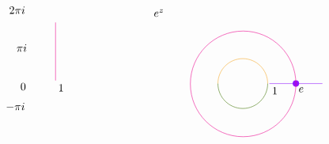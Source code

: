 \documentclass[12pt]{article}
\begin{document}
\[\begin{tikzpicture}[x=0.75pt,y=0.75pt,yscale=-1,xscale=1]
    \draw [color={rgb, 255:red, 144; green, 19; blue, 254 }  ,draw opacity=1 ]   (435.35,134.06) -- (467.35,134.06) ;
    \draw [shift={(435.35,134.06)}, rotate = 0] [color={rgb, 255:red, 144; green, 19; blue, 254 }  ,draw opacity=1 ][fill={rgb, 255:red, 144; green, 19; blue, 254 }  ,fill opacity=1 ][line width=0.75]      (0, 0) circle [x radius= 3.35, y radius= 3.35]   ;
    \draw [color={rgb, 255:red, 144; green, 19; blue, 254 }  ,draw opacity=1 ]   (403.35,134.06) -- (435.35,134.06) ;
    \draw  [draw opacity=0] (341.35,134.06) .. controls (341.35,134.06) and (341.35,134.06) .. (341.35,134.06) .. controls (341.35,117.49) and (354.78,104.06) .. (371.35,104.06) .. controls (387.92,104.06) and (401.35,117.49) .. (401.35,134.06) .. controls (401.35,134.06) and (401.35,134.06) .. (401.35,134.06) -- (371.35,134.06) -- cycle ; \draw [color={rgb, 255:red, 245; green, 166; blue, 35 }  ,draw opacity=1 ]   (341.35,134.06) .. controls (341.35,117.49) and (354.78,104.06) .. (371.35,104.06) .. controls (387.92,104.06) and (401.35,117.49) .. (401.35,134.06) ;  
    \draw  [draw opacity=0] (401.35,134.06) .. controls (401.35,134.06) and (401.35,134.06) .. (401.35,134.06) .. controls (401.35,150.63) and (387.92,164.06) .. (371.35,164.06) .. controls (354.78,164.06) and (341.35,150.63) .. (341.35,134.06) .. controls (341.35,134.06) and (341.35,134.06) .. (341.35,134.06) -- (371.35,134.06) -- cycle ; \draw [color={rgb, 255:red, 65; green, 117; blue, 5 }  ,draw opacity=1 ]   (401.35,134.06) .. controls (401.35,150.63) and (387.92,164.06) .. (371.35,164.06) .. controls (354.78,164.06) and (341.35,150.63) .. (341.35,134.06) ;  
    \draw [color=magenta  ,draw opacity=1 ]   (145.63,60.46) -- (145.63,130.39) ;
    \draw  [color=magenta  ,draw opacity=1 ] (308.15,134.46) .. controls (308.15,99.34) and (336.63,70.86) .. (371.75,70.86) .. controls (406.88,70.86) and (435.35,99.34) .. (435.35,134.46) .. controls (435.35,169.59) and (406.88,198.06) .. (371.75,198.06) .. controls (336.63,198.06) and (308.15,169.59) .. (308.15,134.46) -- cycle ;
    
    \draw (102,132.4) node [anchor=north west][inner sep=0.75pt]    {$0$};
    \draw (147.63,133.79) node [anchor=north west][inner sep=0.75pt]    {$1$};
    \draw (88.4,40) node [anchor=north west][inner sep=0.75pt]    {$2\pi i$};
    \draw (97.2,85.6) node [anchor=north west][inner sep=0.75pt]    {$\pi i$};
    \draw (84.4,156) node [anchor=north west][inner sep=0.75pt]    {$-\pi i$};
    \draw (262.8,43.4) node [anchor=north west][inner sep=0.75pt]    {$e^{z}$};
    \draw (405.35,137.46) node [anchor=north west][inner sep=0.75pt]    {$1$};
    \draw (437.35,137.46) node [anchor=north west][inner sep=0.75pt]    {$e$};
    
    
    \end{tikzpicture}
    \]
\end{document}
